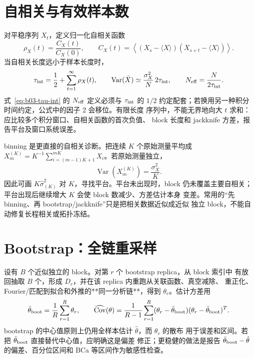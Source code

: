 \section{自相关与有效样本数}

对平稳序列 \(X_t\)，定义归一化自相关函数
\begin{equation}
  \rho_X(t)=\frac{C_X(t)}{C_X(0)},
  \qquad
  C_X(t)=\left\langle (X_s-\langle X\rangle)(X_{s+t}-\langle X\rangle)\right\rangle .
  \label{eq:b03-autocorr}
\end{equation}
当自相关长度远小于样本长度时，
\begin{equation}
  \tau_{\rm int}=\frac12+\sum_{t=1}^{\infty}\rho_X(t),
  \qquad
  \operatorname{Var}(\bar X)\simeq\frac{\sigma_X^2}{N}\,2\tau_{\rm int},
  \qquad
  N_{\rm eff}=\frac{N}{2\tau_{\rm int}}.
  \label{eq:b03-tau-int}
\end{equation}
式~\eqref{eq:b03-tau-int} 的 \(N_{\rm eff}\) 定义必须与 \(\tau_{\rm int}\) 的
\(1/2\) 约定配套；若换用另一种积分时间约定，公式中的因子 2 会移位。有限长度
序列中，不能无界地向大 \(t\) 求和：应比较多个积分窗口、自相关函数的首次负值、
block 长度和 jackknife 方差，报告平台及窗口系统误差。

binning 是更直接的自相关诊断。把连续 \(K\) 个原始测量平均成
\(X_m^{(K)}=K^{-1}\sum_{i=(m-1)K+1}^{mK}X_i\)。若原始测量独立，
\begin{equation}
  \operatorname{Var}\!\left(X_m^{(K)}\right)=\frac{\sigma_X^2}{K}.
  \label{eq:b03-binning}
\end{equation}
因此可画 \(K\widehat\sigma^2_{(K)}\) 对 \(K\)，寻找平台。平台未出现时，block
仍未覆盖主要自相关；平台出现后继续增大 \(K\) 会使 block 数减少、方差估计本身
变差。常用的“先 binning、再 bootstrap/jackknife”只是把相关数据近似成近似
独立 block，不能自动修复长程相关或拓扑冻结。

\section{Bootstrap：全链重采样}

设有 \(B\) 个近似独立的 block。对第 \(r\) 个 bootstrap replica，从 block 索引中
有放回抽取 \(B\) 个，形成 \(D_r\)，并在该 replica 内重跑从关联函数、真空减除、
重正化、Fourier/匹配到拟合和外推的**同一分析链**，得到 \(\theta_r\)。估计方差用
\begin{equation}
  \bar\theta_{\rm boot}=\frac1R\sum_{r=1}^R\theta_r,
  \qquad
  \widehat{\operatorname{Cov}}(\theta)
  =\frac{1}{R-1}\sum_{r=1}^R
  (\theta_r-\bar\theta_{\rm boot})(\theta_r-\bar\theta_{\rm boot})^T .
  \label{eq:b03-bootstrap-cov}
\end{equation}
bootstrap 的中心值原则上仍用全样本估计 \(\hat\theta\)，而 \(\theta_r\) 的散布
用于误差和区间。若把 \(\bar\theta_{\rm boot}\) 直接替代中心值，应明确这是偏差
修正；更稳健的做法是报告 \(\bar\theta_{\rm boot}-\hat\theta\) 的偏差、百分位区间和
BCa 等区间作为敏感性检查。

